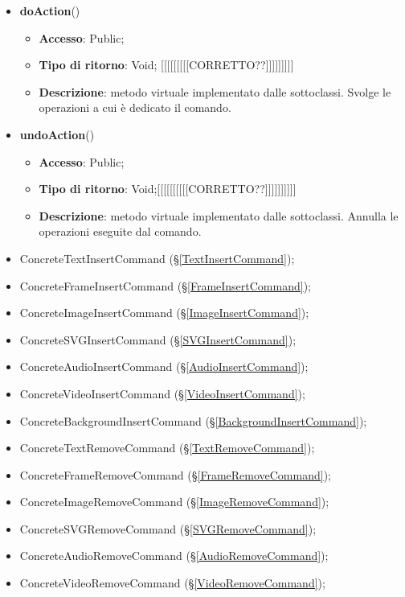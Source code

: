 {{{		
		\begin{itemize}
			\item \textbf{doAction}()
			\begin{itemize}
				\item \textbf{Accesso}: Public;
				\item \textbf{Tipo di ritorno}: Void; [[[[[[[[[CORRETTO??]]]]]]]]]
				\item \textbf{Descrizione}: metodo virtuale implementato dalle sottoclassi. Svolge le operazioni a cui è dedicato il comando.
			\end{itemize}
			\item \textbf{undoAction}()
			\begin{itemize}
				\item \textbf{Accesso}: Public;
				\item \textbf{Tipo di ritorno}: Void;[[[[[[[[[[CORRETTO??]]]]]]]]]]
				\item \textbf{Descrizione}: metodo virtuale implementato dalle sottoclassi. Annulla le operazioni eseguite dal comando.
			\end{itemize}
		\end{itemize}
		\begin{itemize}
			\item ConcreteTextInsertCommand (\S\ref{TextInsertCommand});
			\item ConcreteFrameInsertCommand (\S\ref{FrameInsertCommand});
			\item ConcreteImageInsertCommand (\S\ref{ImageInsertCommand});
			\item ConcreteSVGInsertCommand (\S\ref{SVGInsertCommand});
			\item ConcreteAudioInsertCommand (\S\ref{AudioInsertCommand});
			\item ConcreteVideoInsertCommand (\S\ref{VideoInsertCommand});
			\item ConcreteBackgroundInsertCommand (\S\ref{BackgroundInsertCommand});
			\item ConcreteTextRemoveCommand (\S\ref{TextRemoveCommand});
			\item ConcreteFrameRemoveCommand (\S\ref{FrameRemoveCommand});
			\item ConcreteImageRemoveCommand (\S\ref{ImageRemoveCommand});
			\item ConcreteSVGRemoveCommand (\S\ref{SVGRemoveCommand});
			\item ConcreteAudioRemoveCommand (\S\ref{AudioRemoveCommand});
			\item ConcreteVideoRemoveCommand (\S\ref{VideoRemoveCommand});

\end{itemize}}}}

